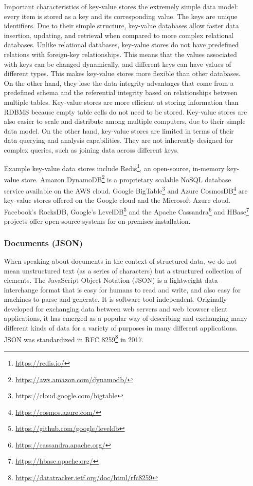 Important characteristics of key-value stores the extremely simple data model: every item is stored as a key and its corresponding value. The keys are unique identifiers. Due to their simple structure, key-value databases allow faster data insertion, updating, and retrieval when compared to more complex relational databases. Unlike relational databases, key-value stores do not have predefined relations with foreign-key relationships. This means that the values associated with keys can be changed dynamically, and different keys can have values of different types. This makes key-value stores more flexible than other databases. On the other hand, they lose the data integrity advantages that come from a predefined schema and the referential integrity based on relationships between multiple tables. Key-value stores are more efficient at storing information than RDBMS because empty table cells do not need to be stored. Key-value stores are also easier to scale and distribute among multiple computers, due to their simple data model. On the other hand, key-value stores are limited in terms of their data querying and analysis capabilities. They are not inherently designed for complex queries, such as joining data across different keys. 

Example key-value data stores include Redis\footnote{\url{https://redis.io/}}, an open-source, in-memory key-value store. Amazon DynamoDB\footnote{\url{https://aws.amazon.com/dynamodb/}} is a proprietary scalable NoSQL database service available on the AWS cloud. Google BigTable\footnote{\url{https://cloud.google.com/bigtable}} and Azure CosmosDB\footnote{\url{https://cosmos.azure.com/}} are key-value stores offered on the Google cloud and the Microsoft Azure cloud. Facebook's RocksDB, Google's LevelDB\footnote{\url{https://github.com/google/leveldb}} and the Apache Cassandra\footnote{\url{https://cassandra.apache.org/}} and HBase\footnote{\url{https://hbase.apache.org/}} projects offer open-source systems for on-premises installation.

\subsubsection*{Documents (JSON)}

When speaking about documents in the context of structured data, we do not mean unstructured text (as a series of characters) but a structured collection of elements. The JavaScript Object Notation (JSON) is a lightweight data-interchange format that is easy for humans to read and write, and also easy for machines to parse and generate. It is software tool independent. Originally developed for exchanging data between web servers and web browser client applications, it has emerged as a popular way of describing and exchanging many different kinds of data for a variety of purposes in many different applications. JSON was standardized in RFC 8259\footnote{\url{https://datatracker.ietf.org/doc/html/rfc8259}} in 2017.

